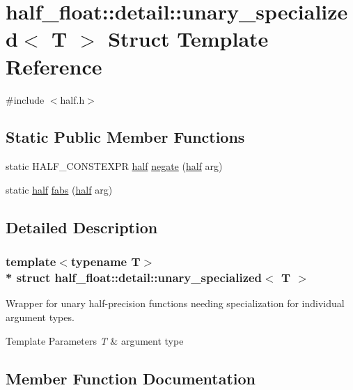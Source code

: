 \hypertarget{structhalf__float_1_1detail_1_1unary__specialized}{}\section{half\+\_\+float\+:\+:detail\+:\+:unary\+\_\+specialized$<$ T $>$ Struct Template Reference}
\label{structhalf__float_1_1detail_1_1unary__specialized}


{\ttfamily \#include $<$half.\+h$>$}

\subsection*{Static Public Member Functions}
\begin{DoxyCompactItemize}
\item 
static H\+A\+L\+F\+\_\+\+C\+O\+N\+S\+T\+E\+X\+PR \hyperlink{classhalf__float_1_1half}{half} \hyperlink{structhalf__float_1_1detail_1_1unary__specialized_a6b8b9de170c31ccbcc6ef56ed9c488a1}{negate} (\hyperlink{classhalf__float_1_1half}{half} arg)
\item 
static \hyperlink{classhalf__float_1_1half}{half} \hyperlink{structhalf__float_1_1detail_1_1unary__specialized_a9f98cb43656e90319b63016c7dbadfc0}{fabs} (\hyperlink{classhalf__float_1_1half}{half} arg)
\end{DoxyCompactItemize}


\subsection{Detailed Description}
\subsubsection*{template$<$typename T$>$\\*
struct half\+\_\+float\+::detail\+::unary\+\_\+specialized$<$ T $>$}

Wrapper for unary half-\/precision functions needing specialization for individual argument types. 
\begin{DoxyTemplParams}{Template Parameters}
{\em T} & argument type \\
\hline
\end{DoxyTemplParams}


\subsection{Member Function Documentation}
